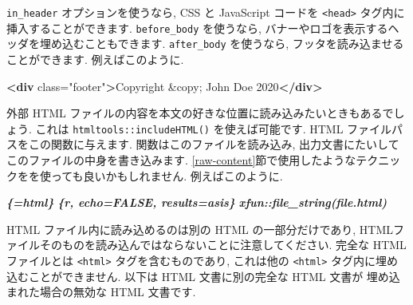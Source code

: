 \documentclass[
  11pt,
  lualatex,ja=standard,jafont=noto]{bxjsreport}
\newenvironment{Shaded}{\begin{snugshade}}{\end{snugshade}}
\newcommand{\DecValTok}[1]{\textcolor[rgb]{0.00,0.00,0.81}{#1}}
\newcommand{\InformationTok}[1]{\textcolor[rgb]{0.56,0.35,0.01}{\textbf{\textit{#1}}}}
\newcommand{\KeywordTok}[1]{\textcolor[rgb]{0.13,0.29,0.53}{\textbf{#1}}}
\newcommand{\NormalTok}[1]{#1}
\newcommand{\OtherTok}[1]{\textcolor[rgb]{0.56,0.35,0.01}{#1}}
\newcommand{\StringTok}[1]{\textcolor[rgb]{0.31,0.60,0.02}{#1}}
\begin{document}
\texttt{in\_header} オプションを使うなら, CSS と JavaScript コードを \texttt{\textless{}head\textgreater{}} タグ内に挿入することができます. \texttt{before\_body} を使うなら, バナーやロゴを表示するヘッダを埋め込むこともできます. \texttt{after\_body} を使うなら, フッタを読み込ませることができます. 例えばこのように.

\begin{Shaded}
\begin{Highlighting}[]
\KeywordTok{\textless{}div}\OtherTok{ class=}\StringTok{"footer"}\KeywordTok{\textgreater{}}\NormalTok{Copyright }\DecValTok{\&copy;}\NormalTok{ John Doe 2020}\KeywordTok{\textless{}/div\textgreater{}}
\end{Highlighting}
\end{Shaded}

外部 HTML ファイルの内容を本文の好きな位置に読み込みたいときもあるでしょう. これは \texttt{htmltools::includeHTML()} を使えば可能です. HTML ファイルパスをこの関数に与えます. 関数はこのファイルを読み込み, 出力文書にたいしてこのファイルの中身を書き込みます. \ref{raw-content}節で使用したようなテクニックをを使っても良いかもしれません. 例えばこのように.

\begin{Shaded}
\begin{Highlighting}[]
\InformationTok{\textasciigrave{}\textasciigrave{}\textasciigrave{}\textasciigrave{}\{=html\}}
\InformationTok{\textasciigrave{}\textasciigrave{}\textasciigrave{}\{r, echo=FALSE, results=\textquotesingle{}asis\textquotesingle{}\}}
\InformationTok{xfun::file\_string(\textquotesingle{}file.html\textquotesingle{})}
\InformationTok{\textasciigrave{}\textasciigrave{}\textasciigrave{}}
\InformationTok{\textasciigrave{}\textasciigrave{}\textasciigrave{}\textasciigrave{}}
\end{Highlighting}
\end{Shaded}

HTML ファイル内に読み込めるのは別の HTML の一部分だけであり, HTMLファイルそのものを読み込んではならないことに注意してください. 完全な HTML ファイルとは \texttt{\textless{}html\textgreater{}} タグを含むものであり, これは他の \texttt{\textless{}html\textgreater{}} タグ内に埋め込むことができません. 以下は HTML 文書に別の完全な HTML 文書が 埋め込まれた場合の無効な HTML 文書です.
\end{document}
